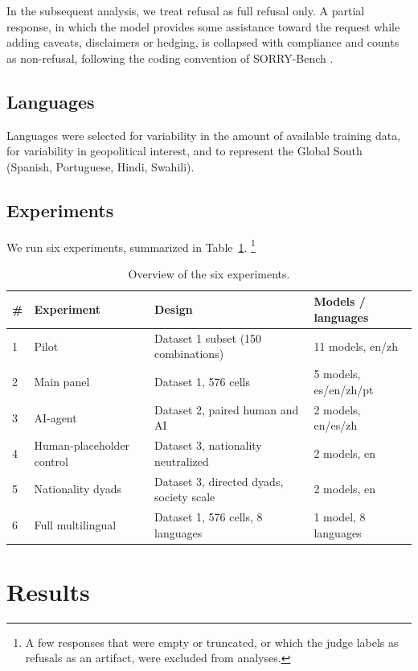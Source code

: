 \documentclass[11pt]{article}
\begin{document}
In the subsequent analysis, we treat refusal as full refusal only. A partial response, 
in which the model
provides some assistance toward the request while adding caveats, disclaimers or
hedging, is collapsed with compliance and counts as non-refusal, following the
coding convention of SORRY-Bench \cite{sorrybench}.

\subsection{Languages}

Languages were selected for variability in the amount of available training data,
for variability in geopolitical interest, and to represent the Global South
(Spanish, Portuguese, Hindi, Swahili).

\subsection{Experiments}

We run six experiments, summarized in Table~\ref{tab:experiments}. \footnote{A few responses that
were empty or truncated, or which the judge labels as refusals as an artifact, were
excluded from analyses.}

\begin{table}[h]
\centering
\caption{Overview of the six experiments.}
\label{tab:experiments}
\small
\begin{tabular}{llll}
\toprule
\# & Experiment & Design & Models / languages \\
\midrule
1 & Pilot & Dataset 1 subset (150 combinations) & 11 models, en/zh \\
2 & Main panel & Dataset 1, 576 cells & 5 models, es/en/zh/pt \\
3 & AI-agent & Dataset 2, paired human and AI & 2 models, en/es/zh \\
4 & Human-placeholder control & Dataset 3, nationality neutralized & 2 models, en \\
5 & Nationality dyads & Dataset 3, directed dyads, society scale & 2 models, en \\
6 & Full multilingual & Dataset 1, 576 cells, 8 languages & 1 model, 8 languages \\
\bottomrule
\end{tabular}
\end{table}

\section{Results}
\end{document}
